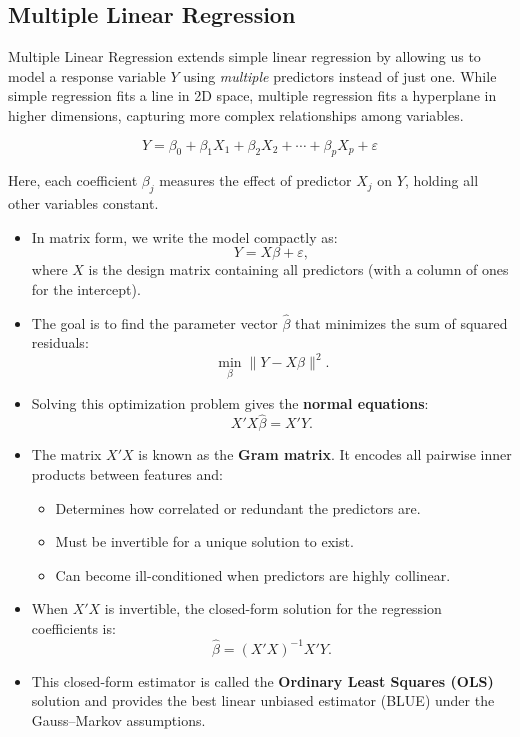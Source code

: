 \documentclass[11pt,a4paper]{article}
\begin{document}
\subsection{Multiple Linear Regression}

Multiple Linear Regression extends simple linear regression by allowing us to model a response variable $Y$ using \emph{multiple} predictors instead of just one.  
While simple regression fits a line in 2D space, multiple regression fits a hyperplane in higher dimensions, capturing more complex relationships among variables.

\[
Y = \beta_0 + \beta_1 X_1 + \beta_2 X_2 + \cdots + \beta_p X_p + \varepsilon
\]

Here, each coefficient $\beta_j$ measures the effect of predictor $X_j$ on $Y$, holding all other variables constant.

\begin{itemize}
    \item In matrix form, we write the model compactly as:
    \[
        Y = X\beta + \varepsilon,
    \]
    where $X$ is the design matrix containing all predictors (with a column of ones for the intercept).

    \item The goal is to find the parameter vector $\hat{\beta}$ that minimizes the sum of squared residuals:
    \[
        \min_{\beta} \| Y - X\beta \|^2.
    \]

    \item Solving this optimization problem gives the \textbf{normal equations}:
    \[
        X'X\hat{\beta} = X'Y.
    \]

    \item The matrix $X'X$ is known as the \textbf{Gram matrix}. It encodes all pairwise inner products between features and:
    \begin{itemize}
        \item Determines how correlated or redundant the predictors are.
        \item Must be invertible for a unique solution to exist.
        \item Can become ill-conditioned when predictors are highly collinear.
    \end{itemize}

    \item When $X'X$ is invertible, the closed-form solution for the regression coefficients is:
    \[
        \hat{\beta} = (X'X)^{-1} X'Y.
    \]

    \item This closed-form estimator is called the \textbf{Ordinary Least Squares (OLS)} solution and provides the best linear unbiased estimator (BLUE) under the Gauss–Markov assumptions.
\end{itemize}
\end{document}

